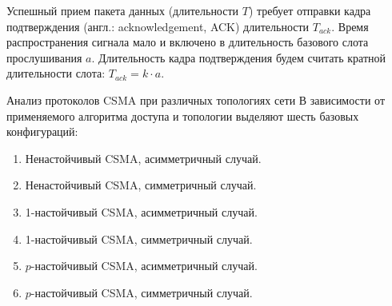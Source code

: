 Успешный прием пакета данных (длительности $T$) требует отправки кадра подтверждения (англ.: acknowledgement, ACK) длительности $T_{ack}$. Время распространения сигнала мало и включено в длительность базового слота прослушивания $a$. Длительность кадра подтверждения будем считать кратной длительности слота: $T_{ack} = k \cdot a$. 

\begin{example}{Анализ протоколов CSMA при различных топологиях сети}
В зависимости от применяемого алгоритма доступа и топологии выделяют шесть базовых конфигураций:

\begin{enumerate}
    \item Ненастойчивый CSMA, асимметричный случай.
    \item Ненастойчивый CSMA, симметричный случай.
    \item 1-настойчивый CSMA, асимметричный случай.
    \item 1-настойчивый CSMA, симметричный случай.
    \item $p$-настойчивый CSMA, асимметричный случай.
    \item $p$-настойчивый CSMA, симметричный случай.
\end{enumerate}

\begin{center}
\end{center}
\end{example}
